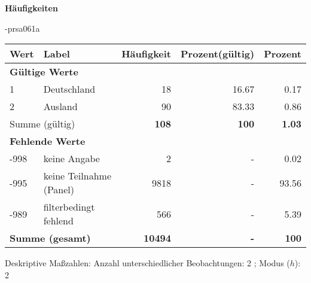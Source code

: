        		\vspace*{0.5cm}
                \noindent\textbf{Häufigkeiten}

                \vspace*{-\baselineskip}
					\begin{filecontents}{\jobname-prsa061a}
					\begin{longtable}{lXrrr}
					\toprule
					\textbf{Wert} & \textbf{Label} & \textbf{Häufigkeit} & \textbf{Prozent(gültig)} & \textbf{Prozent} \\
					\endhead
					\midrule
					\multicolumn{5}{l}{\textbf{Gültige Werte}}\\

					1 &
					\multicolumn{1}{X}{ Deutschland   } &


					  \num{18} &
					  \num[round-mode=places,round-precision=2]{16.67} &
					    \num[round-mode=places,round-precision=2]{0.17} \\

					2 &
					\multicolumn{1}{X}{ Ausland   } &


					  \num{90} &
					  \num[round-mode=places,round-precision=2]{83.33} &
					    \num[round-mode=places,round-precision=2]{0.86} \\
					\midrule
					\multicolumn{2}{l}{Summe (gültig)} &
					  \textbf{\num{108}} &
					\textbf{\num{100}} &
					  \textbf{\num[round-mode=places,round-precision=2]{1.03}} \\
					\multicolumn{5}{l}{\textbf{Fehlende Werte}}\\
							-998 &
							keine Angabe &
							  \num{2} &
							 - &
							  \num[round-mode=places,round-precision=2]{0.02} \\
							-995 &
							keine Teilnahme (Panel) &
							  \num{9818} &
							 - &
							  \num[round-mode=places,round-precision=2]{93.56} \\
							-989 &
							filterbedingt fehlend &
							  \num{566} &
							 - &
							  \num[round-mode=places,round-precision=2]{5.39} \\
					\midrule
					\multicolumn{2}{l}{\textbf{Summe (gesamt)}} &
				      \textbf{\num{10494}} &
				    \textbf{-} &
				    \textbf{\num{100}} \\
					\bottomrule
					\end{longtable}
					\end{filecontents}
				\label{tableValues:prsa061a}
				\vspace*{-\baselineskip}
                    \begin{noten}
                	    \note{} Deskriptive Maßzahlen:
                	    Anzahl unterschiedlicher Beobachtungen: 2%
                	    ; 
                	      Modus ($h$): 2
                     \end{noten}


